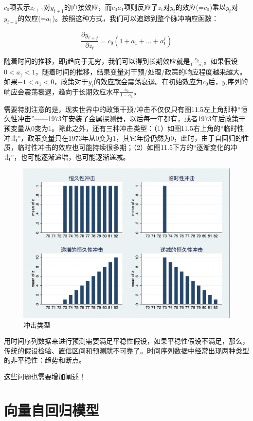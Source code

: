 \documentclass[cn,12pt,math=newtx,citestyle=gb7714-2015,bibstyle=gb7714-2015]{elegantbook}
\begin{document}
    $c_0$项表示$z_{t+1}$对$y_{t+1}$的直接效应，而$c_0a_1$项则反应了$z_t$对$y_t$的效应(=$c_0$)乘以$y_t$对$y_{t+1}$的效应(=$a_1$)。按照这种方式，我们可以追踪到整个脉冲响应函数：
    
   $$\frac{\partial y_{t+j}}{\partial z_t} = c_0(1+a_1+...+a_1^j)$$
   
   随着时间的推移，即j趋向于无穷，我们可以得到长期效应就是$\frac{c_0}{1-a_1}$。如果假设$0<a_1<1$，随着时间的推移，结果变量对干预/处理/政策的响应程度越来越大。如果$-1<a_1<0$，政策对于$y_t$的效应就会震荡衰退。在初始效应为$c_0$后，$y_t$序列的响应会震荡衰退，趋向于长期效应水平$\frac{c_0}{1-a_1}$。
   
   需要特别注意的是，现实世界中的政策干预/冲击不仅仅只有图11.5左上角那种“恒久性冲击”——1973年安装了金属探测器，以后每一年都有，或者1973年后政策干预变量从0变为1。除此之外，还有三种冲击类型：（1）如图11.5右上角的“临时性冲击”，政策变量只在1973年从0变为1，其它年份仍然为0，此时，由于自回归的性质，临时性冲击的效应也可能持续很多期；（2）如图11.5下方的“逐渐变化的冲击”，也可能逐渐递增，也可能逐渐递减。
   
   \begin{figure}[tbph]
   	\centering
   	\includegraphics[width=0.8\linewidth]{shock_type}
   	\caption{冲击类型}
   	\label{fig:shocktype}
   \end{figure}
   

    用时间序列数据来进行预测需要满足平稳性假设，如果平稳性假设不满足，那么，传统的假设检验、置信区间和预测就不可靠了。时间序列数据中经常出现两种类型的非平稳性：趋势和断点。
    
    这些问题也需要增加阐述！
	
	\section{向量自回归模型}
	
\end{document}
